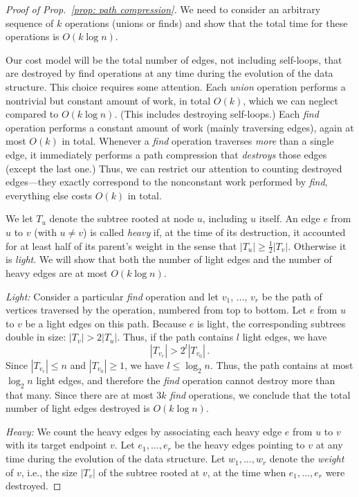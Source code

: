 \documentclass{tstextbook}
\begin{document}
\begin{proof}[Proof of Prop.~\ref{prop: path compression}]
  We need to consider an arbitrary sequence of $k$ operations (unions or finds) and show that the total time for these operations is $O(k\log n)$.

  Our cost model will be the total number of edges, not including self-loops, that are destroyed by find operations at any time during the evolution of the data structure.
  This choice requires some attention.
  Each \emph{union} operation performs a nontrivial but constant amount of work, in total $O(k)$, which we can neglect compared to $O(k \log n)$.
  (This includes destroying self-loops.)
  Each \emph{find} operation performs a constant amount of work (mainly traversing edges), again at most $O(k)$ in total.
  Whenever a \emph{find} operation traverses \emph{more} than a single edge, it immediately performs a path compression that \emph{destroys} those edges (except the last one.)
  Thus, we can restrict our attention to counting destroyed edges---they exactly correspond to the nonconstant work performed by \emph{find}, everything else costs $O(k)$ in total.

  \medskip

  We let $T_u$ denote the subtree rooted at node $u$, including $u$ itself.
  An edge $e$ from $u$ to $v$ (with $u\neq v$) is called \emph{heavy} if, at the time of its destruction, it accounted for at least half of its parent's weight in the sense that $|T_u| \geq \frac12|T_v|$.
  Otherwise it is \emph{light}.
  We will show that both the number of light edges and the number of heavy edges are at most $O(k\log n)$.

  \medskip
  \emph{Light:}
  Consider a particular \emph{find} operation and let $v_1$, $\ldots$, $v_r$ be the path of vertices traversed by the operation, numbered from top to bottom.
  Let $e$ from $u$ to $v$ be a light edges on this path.
  Because $e$ is light, the corresponding subtrees double in size: $|T_v|> 2|T_u|$.
  Thus, if the path contains $l$ light edges, we have \[|T_{v_r}| > 2^l |T_{v_0}|\,.\]
  Since $|T_{v_r}|\leq n$ and $|T_{v_0}| \geq 1$, we have $l\leq\log_2 n$.
  Thus, the path contains at most $\log_2 n$ light edges, and therefore the \emph{find} operation cannot destroy more than that many.
  Since there are at most $3k$ \emph{find} operations, we conclude that the total number of light edges destroyed is $O(k\log n)$.
 
  \medskip
  \emph{Heavy:}
  We count the heavy edges by associating each heavy edge $e$ from $u$ to $v$ with its target endpoint $v$.
  Let $e_1,\ldots, e_r$ be the heavy edges pointing to $v$ at any time during the evolution of the data structure.
  Let $w_1,\ldots, w_r$ denote the \emph{weight} of $v$, i.e., the size $|T_v|$ of the subtree rooted at $v$, at the time when $e_1,\ldots, e_r$ were destroyed.


\end{proof}
\end{document}
